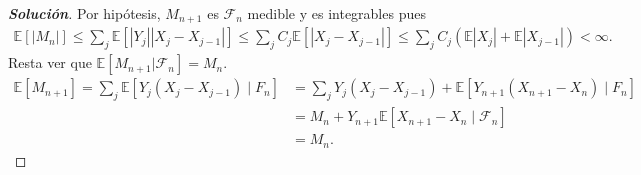 \documentclass[11pt]{article}
\theoremstyle{ejstyle}
\newenvironment{solucion}
{\begin{proof}[{\bfseries\color{deepindigo} Solución}]}
	{\end{proof}}
\begin{document}
	\begin{solucion}
		Por hipótesis, $M_{n+1}$ es $\mathcal{F}_n$ medible y es integrables pues
		\[
		\begin{aligned}
		\mathbb{E}[|M_n|] \leq \sum_j \mathbb{E}[|Y_j| |X_j - X_{j-1}|] \leq \sum_j C_j \mathbb{E}[|X_j - X_{j-1}|] \leq \sum_j C_j (\mathbb{E}|X_j| + \mathbb{E}|X_{j-1}|) < \infty.
		\end{aligned}	
		\]  
		Resta ver que $\mathbb{E}[M_{n+1}|\mathcal{F}_n] = M_n.$ 
		\[
		\begin{aligned}
			\mathbb{E}[M_{n+1}] = \sum_j \mathbb{E}[Y_j (X_j - X_{j-1}) \mid F_n] &= \sum_j Y_j (X_j - X_{j-1}) + \mathbb{E}[Y_{n+1}(X_{n+1} - X_n) \mid F_n] \\
			&= M_n + Y_{n+1} \mathbb{E}[X_{n+1} - X_n \mid \mathcal{F}_n] \\ 
			&= M_n.
		\end{aligned}
		\]
	\end{solucion}
	
\end{document}
